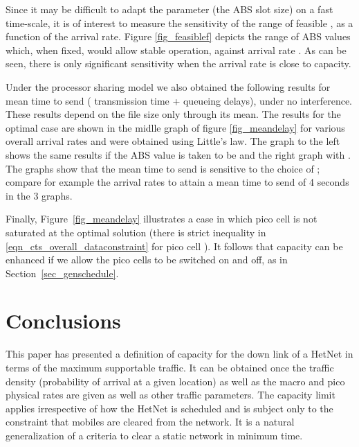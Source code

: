 \documentclass[12pt, draftcls, onecolumn]{IEEEtranTCOM}
\begin{document}
{Since it may be difficult to adapt the parameter  (the ABS slot size) on a fast time-scale, it is of interest to measure the sensitivity of the range of feasible , as a function of the arrival rate. Figure \ref{fig_feasiblef} depicts the range of ABS values which, when fixed, would allow stable operation,
against arrival rate . As can be seen, there is only significant sensitivity when the arrival rate is close to capacity.


Under the processor sharing model we also obtained the following results for mean time to send
( transmission time + queueing delays), under no interference. These results depend on the file size only through its
mean. The results for the optimal case are shown in the midlle graph of figure \ref{fig_meandelay} for various overall arrival rates and were obtained using Little's law. The graph to the left shows the same results if the ABS value is taken to be  and the right graph with .
The graphs show that the mean time to send is sensitive to the choice of ; compare for example the arrival rates
to attain a mean time to send of 4 seconds in the 3 graphs.

Finally, Figure~\ref{fig_meandelay} illustrates a case in which pico cell  is not saturated at the optimal solution (there is strict inequality in \eqref{eqn_cts_overall_dataconstraint} for pico cell ). It follows that capacity can be enhanced if we allow the pico cells to be switched on and off, as in Section~\ref{sec_genschedule}.

 \begin{figure}[t]
    \centering
    \begin{floatrow}
    \end{floatrow}
\end{figure}



\section{Conclusions}
\label{sec_conc}
This paper has presented a definition of capacity for the down link of a HetNet in terms of the maximum supportable traffic. It can be obtained once the traffic density (probability of arrival at a given location)
as well as the  macro and pico physical rates are given as well as other traffic parameters. The
capacity limit applies irrespective of how the HetNet is scheduled and is subject only to the constraint
that mobiles are cleared from the network.  It is a natural generalization of a criteria to
clear a static network in minimum time.

}
\end{document}
